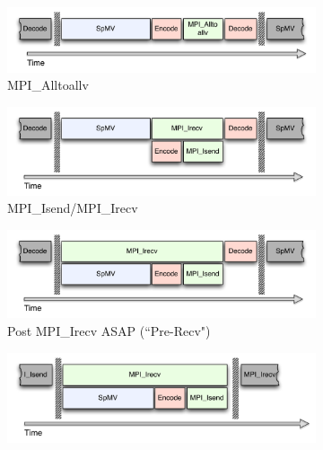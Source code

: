 \documentclass{report}
\begin{document}
\begin{figure} 
\centering
\begin{subfigure}{0.6\textwidth}
\centering
\includegraphics[width=\textwidth]{../figures/omnigraffle/AlltoallvCPU.pdf}
\caption{MPI\_Alltoallv}
\label{fig:alltoallv_cpu}
\end{subfigure}
\begin{subfigure}{0.6\textwidth}
\centering
\includegraphics[width=\textwidth]{../figures/omnigraffle/IsendIrecvCPU.pdf}
\caption{MPI\_Isend/MPI\_Irecv}
\label{fig:isendirecv_cpu}
\end{subfigure}
\begin{subfigure}{0.6\textwidth}
\centering
\includegraphics[width=\textwidth]{../figures/omnigraffle/IsendPreIrecvCPU.pdf}
\caption{Post MPI\_Irecv ASAP (``Pre-Recv")}
\label{fig:preirecv_cpu}
\end{subfigure}
\begin{subfigure}{0.6\textwidth}
\centering
\includegraphics[width=\textwidth]{../figures/omnigraffle/NoDecode.pdf}

\end{subfigure}
\end{figure}
\end{document}
